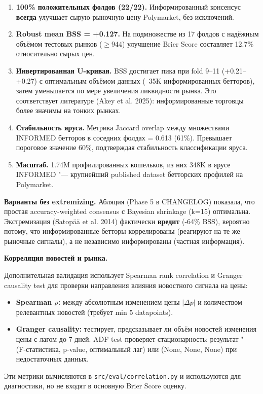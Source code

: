 \begin{enumerate}
    \item \textbf{100\% положительных фолдов (22/22).} Информированный консенсус \textbf{всегда} улучшает сырую рыночную цену Polymarket, без исключений.

    \item \textbf{Robust mean BSS = +0.127.} На подмножестве из 17 фолдов с надёжным объёмом тестовых рынков ($\geq 944$) улучшение Brier Score составляет 12.7\% относительно сырых цен.

    \item \textbf{Инвертированная U-кривая.} BSS достигает пика при fold 9--11 (+0.21--+0.27) с оптимальным объёмом данных (~35K информированных бетторов), затем уменьшается по мере увеличения ликвидности рынка. Это соответствует литературе (Akey et al. 2025): информированные торговцы более значимы на тонких рынках.

    \item \textbf{Стабильность яруса.} Метрика Jaccard overlap между множествами INFORMED бетторов в соседних фолдах = 0.613 (61\%). Превышает пороговое значение 60\%, подтверждая стабильность классификации яруса.

    \item \textbf{Масштаб.} 1.74M профилированных кошельков, из них 348K в ярусе INFORMED "--- крупнейший published dataset бетторских профилей на Polymarket.
\end{enumerate}

\textbf{Варианты без extremizing.} Абляция (Phase 5 в CHANGELOG) показала, что простая accuracy-weighted consensus с Bayesian shrinkage (k=15) оптимальна. Экстремизация (Satopää et al. 2014) фактически \textbf{вредит} (-64\% BSS), вероятно потому, что информированные бетторы коррелированы (реагируют на те же рыночные сигналы), а не независимо информированы (частная информация).

\textbf{Корреляция новостей и рынка.}

Дополнительная валидация использует Spearman rank correlation и Granger causality test для проверки направления влияния новостного сигнала на цены:

\begin{itemize}
    \item \textbf{Spearman $\rho$:} между абсолютным изменением цены $|\Delta p|$ и количеством релевантных новостей (требует min 5 datapoints).
    \item \textbf{Granger causality:} тестирует, предсказывает ли объём новостей изменения цены с лагом до 7 дней. ADF test проверяет стационарность; результат "--- (F-статистика, p-value, оптимальный лаг) или (None, None, None) при недостаточных данных.
\end{itemize}

Эти метрики вычисляются в \texttt{src/eval/correlation.py} и используются для диагностики, но не входят в основную Brier Score оценку.
